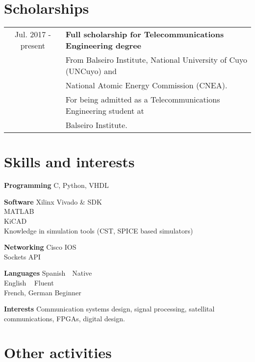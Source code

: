 \documentclass[10pt]{article}
\newcommand{\tab}{\hspace{\parindent}}
\begin{document}
\section*{Scholarships}

\begin{tabular}{cl}

Jul. 2017 - present 	& \textbf{Full scholarship for Telecommunications Engineering degree} \\
						& \tab From Balseiro Institute, National University of Cuyo (UNCuyo) and \\
						& \tab \tab National Atomic Energy Commission (CNEA). \\
						& \tab For being admitted as a Telecommunications Engineering student at \\
						& \tab \tab Balseiro Institute. \\
\end{tabular}

\section*{Skills and interests}

\hangindent=1.3cm \tab \textbf{Programming}\newline
C, Python, VHDL

\hangindent=1.3cm \textbf{Software}\newline
Xilinx Vivado \& SDK\\
MATLAB\\
KiCAD\\
Knowledge in simulation tools (CST, SPICE based simulators)

\hangindent=1.3cm \textbf{Networking}\newline
Cisco IOS\\
Sockets API

\hangindent=1.3cm \textbf{Languages}\newline
Spanish	\tab \tab \tab \tab \,\, Native\\
English \tab \tab \tab \tab \,\,\, Fluent\\
French, German \tab \tab Beginner

\hangindent=1.3cm \textbf{Interests}\newline
Communication systems design, signal processing, satellital communications, FPGAs, digital design.

\section*{Other activities}
\end{document}
